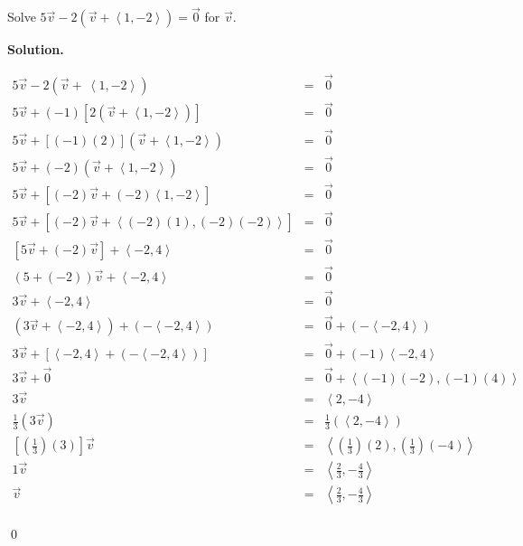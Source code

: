 \begin{ex} \label{vectoreqnex}  Solve $5\vec{v} - 2\left(\vec{v} + \left<1,-2\right>\right) = \vec{0}$ for $\vec{v}$.

\medskip

{\bf Solution.}  

\[ \begin{array}{rcl}

5\vec{v} - 2\left(\vec{v} +\ \left<1,-2\right>\right) & = &  \vec{0} \\
5\vec{v} + (-1)\left[ 2\left(\vec{v} +\left<1,-2\right>\right)\right] & = &  \vec{0}\\
5\vec{v} + [(-1)(2)]\left(\vec{v} + \left<1,-2\right>\right) &  = &  \vec{0}\\
5\vec{v} + (-2)\left(\vec{v} + \left<1,-2\right>\right)  &  = &  \vec{0}\\
5\vec{v} + \left[(-2)\vec{v} + (-2)\left<1,-2\right> \right] &  = &  \vec{0}\\
5\vec{v} + \left[(-2)\vec{v} + \left<(-2)(1),(-2)(-2)\right> \right] &  = &  \vec{0}\\
\left[5\vec{v} + (-2)\vec{v}\right] + \left<-2,4\right> &  = &  \vec{0}\\
(5 + (-2)) \vec{v} + \left<-2,4\right>  &  = &  \vec{0}\\
3\vec{v} + \left<-2,4\right>  &  = &  \vec{0}\\
\left(3\vec{v} + \left<-2,4\right>\right) + \left(- \left<-2,4\right>\right)  &  = &  \vec{0} + \left(- \left<-2,4\right>\right)\\
3\vec{v} + \left[\left<-2,4\right> + \left(- \left<-2,4\right>\right)\right]  &  = &  \vec{0} +  (-1) \left<-2,4\right>\\
3\vec{v} + \vec{0}  &  = &  \vec{0} +  \left<(-1)(-2),(-1)(4)\right>\\
3\vec{v}   &  = &   \left<2,-4\right>\\[3pt]
\frac{1}{3} \left(3\vec{v} \right)  &  = &   \frac{1}{3} \left(\left<2,-4\right>\right)\\[3pt]
\left[\left(\frac{1}{3}\right) (3) \right]\vec{v}   &  = &   \left< \left(\frac{1}{3}\right)(2), \left(\frac{1}{3}\right)(-4)\right>\\[3pt]
 1 \vec{v} & = & \left< \frac{2}{3}, -\frac{4}{3} \right> \\[3pt]
 \vec{v} & =&  \left< \frac{2}{3}, -\frac{4}{3} \right> \\
\end{array} \]

\vspace{-.25in} \qed


\end{ex}

